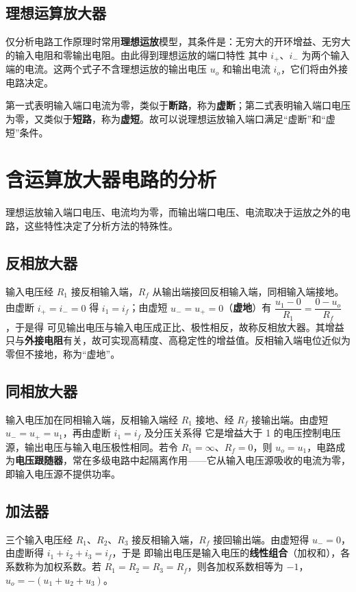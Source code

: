\subsection{理想运算放大器}
仅分析电路工作原理时常用\textbf{理想运放}模型，其条件是：无穷大的开环增益、无穷大的输入电阻和零输出电阻。由此得到理想运放的端口特性
其中 $i_+$、$i_-$ 为两个输入端的电流。这两个式子不含理想运放的输出电压 $u_o$ 和输出电流 $i_o$，它们将由外接电路决定。

第一式表明输入端口电流为零，类似于\textbf{断路}，称为\textbf{虚断}；第二式表明输入端口电压为零，又类似于\textbf{短路}，称为\textbf{虚短}。故可以说理想运放输入端口满足“虚断”和“虚短”条件。


\section{含运算放大器电路的分析}
理想运放输入端口电压、电流均为零，而输出端口电压、电流取决于运放之外的电路，这些特性决定了分析方法的特殊性。

\subsection{反相放大器}
输入电压经 $R_1$ 接反相输入端，$R_f$ 从输出端接回反相输入端，同相输入端接地。由虚断 $i_+=i_-=0$ 得 $i_1=i_f$；由虚短 $u_-=u_+=0$（\textbf{虚地}）有 $\dfrac{u_1-0}{R_1}=\dfrac{0-u_o}{R_f}$，于是得
可见输出电压与输入电压成正比、极性相反，故称反相放大器。其增益只与\textbf{外接电阻}有关，故可实现高精度、高稳定性的增益值。反相输入端电位近似为零但不接地，称为“虚地”。

\subsection{同相放大器}
输入电压加在同相输入端，反相输入端经 $R_1$ 接地、经 $R_f$ 接输出端。由虚短 $u_-=u_+=u_1$，再由虚断 $i_1=i_f$ 及分压关系得
它是增益大于 1 的电压控制电压源，输出电压与输入电压极性相同。若令 $R_1=\infty$、$R_f=0$，则 $u_o=u_1$，电路成为\textbf{电压跟随器}，常在多级电路中起隔离作用——它从输入电压源吸收的电流为零，即输入电压源不提供功率。

\subsection{加法器}
三个输入电压经 $R_1$、$R_2$、$R_3$ 接反相输入端，$R_f$ 接回输出端。由虚短得 $u_-=0$，由虚断得 $i_1+i_2+i_3=i_f$，于是
即输出电压是输入电压的\textbf{线性组合}（加权和），各系数称为加权系数。若 $R_1=R_2=R_3=R_f$，则各加权系数相等为 $-1$，$u_o=-(u_1+u_2+u_3)$。

